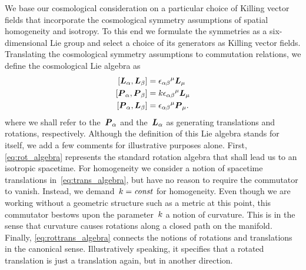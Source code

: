 We base our cosmological consideration on a particular choice of Killing vector fields that incorporate the cosmological symmetry assumptions of spatial homogeneity and isotropy. To this end we formulate the symmetries as a six-dimensional Lie group and select a choice of its generators as Killing vector fields. Translating the cosmological symmetry assumptions to commutation relations, we define the cosmological Lie algebra as
\begin{subequations}\label{eq:cosmo_algebra}
\begin{align}
	\comm{\vect{\Lvec}_\alpha}{\vect{\Lvec}_\beta}&={\levciv_{\alpha\beta}}^\mu\vect{\Lvec}_\mu \label{eq:rot_algebra}\\
	\comm{\vect{\Pvec}_\alpha}{\vect{\Pvec}_\beta}&=\spatcurv{\levciv_{\alpha\beta}}^\mu\vect{\Lvec}_\mu \label{eq:trans_algebra}\\
	\comm{\vect{\Pvec}_\alpha}{\vect{\Lvec}_\beta}&={\levciv_{\alpha\beta}}^\mu\vect{\Pvec}_\mu \label{eq:rottrans_algebra}
	\eqpunct{.}
\end{align}
\end{subequations}
where we shall refer to the~$\boldsymbol{P}_\alpha$ and the~$\boldsymbol{L}_\alpha$ as generating translations and rotations, respectively. Although the definition of this Lie algebra stands for itself, we add a few comments for illustrative purposes alone. First, \eqref{eq:rot_algebra} represents the standard rotation algebra that shall lead us to an isotropic spacetime. For homogeneity we consider a notion of spacetime translations in~\eqref{eq:trans_algebra}, but have no reason to require the commutator to vanish. Instead, we demand~$k=\textnormal{\textit{const}}$ for homogeneity. Even though we are working without a geometric structure such as a metric at this point, this commutator bestows upon the parameter~$k$ a notion of curvature. This is in the sense that curvature causes rotations along a closed path on the manifold. Finally, \eqref{eq:rottrans_algebra} connects the notions of rotations and translations in the canonical sense. Illustratively speaking, it specifies that a rotated translation is just a translation again, but in another direction.

